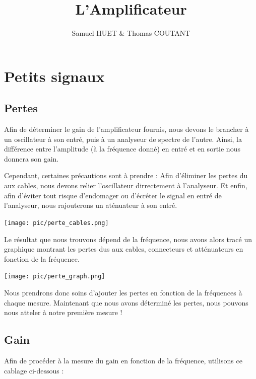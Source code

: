 \documentclass[a4paper,12pt]{report}            %
\author{Samuel HUET \& Thomas COUTANT}
\title{\huge{\textbf{L'Amplificateur}}}
\begin{document}
\maketitle
\renewcommand{\contentsname}{SOMMAIRE} %
\tableofcontents

\chapter{Petits signaux}

\section{Pertes}

Afin de déterminer le gain de l'amplificateur fournis, nous devons le brancher 
à un oscillateur à son entré, puis à un analyseur de spectre de l'autre. Ainsi, 
la différence entre l'amplitude (à la fréquence donné) en entré et en sortie nous 
donnera son gain. 

Cependant, certaines précautions sont à prendre : Afin d'éliminer les pertes du aux cables, 
nous devons relier l'oscillateur dirrectement à l'analyseur. Et enfin, afin d'éviter
tout risque d'endomager ou d'écréter le signal en entré de l'analyseur, nous rajouterons
un aténuateur à son entré.

\begin{center}\texttt{[image: pic/perte\_cables.png]}\\ \end{center}

Le résultat que nous trouvons dépend de la fréquence, nous avons alors tracé un graphique
montrant les pertes dus aux cables, connecteurs et atténuateurs en fonction de la fréquence.

\begin{center}\texttt{[image: pic/perte\_graph.png]}\\ \end{center}

Nous prendrons donc soins d'ajouter les pertes en fonction de la fréquences à chaque mesure.
Maintenant que nous avons déterminé les pertes, nous pouvons nous atteler à notre première mesure !


\section{Gain}

Afin de procéder à la mesure du gain en fonction de la fréquence, utilisons ce cablage ci-dessous :
\end{document}

